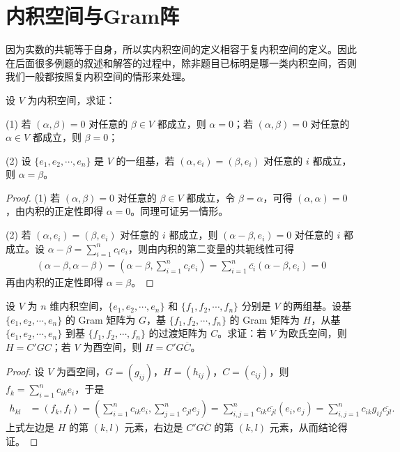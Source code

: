 \documentclass[../../main.tex]{subfiles}%
\begin{document}
\section{内积空间与Gram阵}

\begin{remark}
因为实数的共轭等于自身，所以实内积空间的定义相容于复内积空间的定义。因此在后面很多例题的叙述和解答的过程中，除非题目已标明是哪一类内积空间，否则我们一般都按照复内积空间的情形来处理。
\end{remark}

\begin{proposition}\label{proposition:例9.2}
设 $V$ 为内积空间，求证：

(1) 若 $(\alpha,\beta)=0$ 对任意的 $\beta\in V$ 都成立，则 $\alpha = 0$；若 $(\alpha,\beta)=0$ 对任意的 $\alpha\in V$ 都成立，则 $\beta = 0$；

(2) 设 $\{e_1,e_2,\cdots,e_n\}$ 是 $V$ 的一组基，若 $(\alpha,e_i)=(\beta,e_i)$ 对任意的 $i$ 都成立，则 $\alpha = \beta$。
\end{proposition}
\begin{proof}

(1) 若 $(\alpha,\beta)=0$ 对任意的 $\beta\in V$ 都成立，令 $\beta = \alpha$，可得 $(\alpha,\alpha)=0$，由内积的正定性即得 $\alpha = 0$。同理可证另一情形。

(2) 若 $(\alpha,e_i)=(\beta,e_i)$ 对任意的 $i$ 都成立，则 $(\alpha - \beta,e_i)=0$ 对任意的 $i$ 都成立。设 $\alpha - \beta = \sum_{i = 1}^{n}c_ie_i$，则由内积的第二变量的共轭线性可得
\begin{align*}
(\alpha - \beta,\alpha - \beta)=(\alpha - \beta,\sum_{i = 1}^{n}c_ie_i)=\sum_{i = 1}^{n}\overline{c_i}(\alpha - \beta,e_i)=0
\end{align*}
再由内积的正定性即得 $\alpha = \beta$。

\end{proof}

\begin{proposition}\label{proposition:例9.3}
设 $V$ 为 $n$ 维内积空间，$\{e_1,e_2,\cdots,e_n\}$ 和 $\{f_1,f_2,\cdots,f_n\}$ 分别是 $V$ 的两组基。设基 $\{e_1,e_2,\cdots,e_n\}$ 的 Gram 矩阵为 $G$，基 $\{f_1,f_2,\cdots,f_n\}$ 的 Gram 矩阵为 $H$，从基 $\{e_1,e_2,\cdots,e_n\}$ 到基 $\{f_1,f_2,\cdots,f_n\}$ 的过渡矩阵为 $C$。求证：若 $V$ 为欧氏空间，则 $H = C'GC$；若 $V$ 为酉空间，则 $H = C' G\overline{C}$。
\end{proposition}
\begin{proof}

设 $V$ 为酉空间，$G = (g_{ij})$，$H = (h_{ij})$，$C = (c_{ij})$，则 $f_k = \sum_{i = 1}^{n}c_{ik}e_i$，于是
\begin{align*}
h_{kl}&=(f_k,f_l)=(\sum_{i = 1}^{n}c_{ik}e_i,\sum_{j = 1}^{n}c_{jl}e_j)=\sum_{i,j = 1}^{n}c_{ik}\overline{c_{jl}}(e_i,e_j)=\sum_{i,j = 1}^{n}c_{ik}g_{ij}\overline{c_{jl}}.
\end{align*}
上式左边是 $H$ 的第 $(k, l)$ 元素，右边是 $C' G\overline{C}$ 的第 $(k, l)$ 元素，从而结论得证。

\end{proof}
\end{document}
